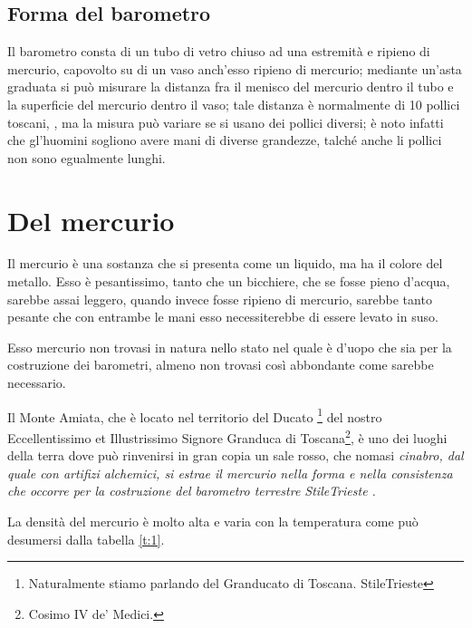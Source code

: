 \documentclass[%
,corpo=11.5pt
,twoside
,cucitura
,tipotesi=frontespizio
]{toptesi}
\begin{document}
\subsection{Forma del barometro}
Il barometro consta di un tubo di vetro chiuso ad una estremit\`a e
ripieno di mercurio, capovolto su di un vaso anch'esso ripieno di
mercurio; mediante un'asta graduata si pu\`o misurare la distanza fra
il menisco del mercurio dentro il tubo e la superficie del mercurio
dentro il vaso; tale distanza \`e normalmente di 10 pollici toscani,
\cite{tor1,tor2}, ma la misura pu\`o variare se si usano dei pollici
diversi; \`e noto infatti che gl'huomini sogliono avere mani di
diverse grandezze, talch\'e anche li pollici non sono egualmente
lunghi.
\section{Del mercurio}
Il mercurio \`e una sostanza che si presenta come un liquido, ma ha il colore del metallo. Esso \`e pesantissimo, tanto che un bicchiere, che se fosse pieno d'acqua, sarebbe assai leggero, quando invece fosse ripieno di mercurio, sarebbe tanto pesante che con entrambe le mani esso necessiterebbe di essere levato in suso.

Esso mercurio non trovasi in natura nello stato nel quale \`e d'uopo che sia
per la costruzione dei barometri, almeno non trovasi cos\`i abbondante come
sarebbe necessario.

\setcounter{footnote}{25}

Il Monte Amiata, che \`e locato nel territorio del Ducato%
\footnote{Naturalmente stiamo parlando del Granducato di Toscana.%
\expandafter\ifx\csname StileTrieste\endcsname\NoteWhiteLine\fi
}
del nostro Eccellentissimo et Illustrissimo Signore Granduca di Toscana\footnote{Cosimo IV de' Medici.}, \`e uno dei
luoghi della terra dove pu\`o rinvenirsi in gran copia un sale rosso, che
nomasi \em cinabro, dal quale con artifizi alchemici, si estrae il mercurio
nella forma e nella consistenza che occorre per la costruzione del barometro
terrestre%
\expandafter\ifx\csname StileTrieste\endcsname
{}\fi.

La densit\`a del mercurio \`e molto alta e varia con la temperatura come
pu\`o desumersi dalla tabella \ref{t:1}.
\end{document}
